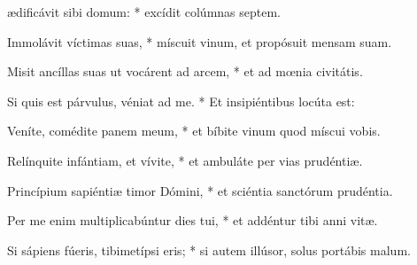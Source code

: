 \begin{psalmus}

 ædificávit sibi domum: * excídit colúmnas septem.

Immolávit víctimas suas, * míscuit vinum, et propósuit mensam suam.

Misit ancíllas suas ut vocárent ad arcem, * et ad mœnia civitátis.

Si quis est párvulus, véniat ad me. * Et insipiéntibus locúta est:

Veníte, comédite panem meum, * et bíbite vinum quod míscui vobis.

Relínquite infántiam, et vívite, * et ambuláte per vias prudéntiæ.

Princípium sapiéntiæ timor Dómini, * et sciéntia sanctórum prudéntia.

Per me enim multiplicabúntur dies tui, * et addéntur tibi anni vitæ.

Si sápiens fúeris, tibimetípsi eris; * si autem illúsor, solus portábis malum.
\end{psalmus}
